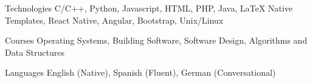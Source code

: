 


\begin{cvskills}


\cvskill
{Technologies} %
{C/C++, Python, Javascript, HTML, PHP, Java, LaTeX {\enskip\cdotp\enskip} Native Templates, React Native, Angular, Bootstrap, Unix/Linux}%

\cvskill
{Courses}
{Operating Systems, Building Software, Software Design, Algorithms and Data Structures}

\cvskill
{Languages} %
{English (Native), Spanish (Fluent), German (Conversational)} %


\end{cvskills}